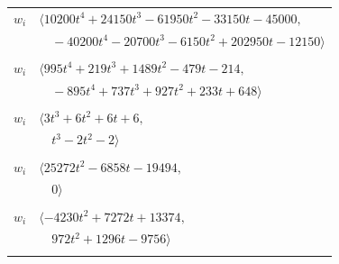 \documentclass[11pt]{article}
\begin{document}
\begin{longtable}{@{}ll@{}}
$w_i$ & $\langle 10200t^{4}+24150t^{3}-61950t^{2}-33150t-45000,$\\
 & $\quad -40200t^{4}-20700t^{3}-6150t^{2}+202950t-12150\rangle$\\
\addlinespace[2pt]
\multicolumn{2}{@{}p{0.97\textwidth}@{}}{$i=46$, $D_i=1$, $\rho_{ij}$: $9{:}1, \allowbreak 14{:}1, \allowbreak 15{:}1, \allowbreak 18{:}3, \allowbreak 26{:}1, \allowbreak 27{:}3, \allowbreak 28{:}3, \allowbreak 30{:}3, \allowbreak 35{:}3, \allowbreak 36{:}1, \allowbreak 49{:}3, \allowbreak 54{:}1, \allowbreak 57{:}1, \allowbreak 64{:}2, \allowbreak 70{:}2, \allowbreak 78{:}1$}\\
$w_i$ & $\langle 995t^{4}+219t^{3}+1489t^{2}-479t-214,$\\
 & $\quad -895t^{4}+737t^{3}+927t^{2}+233t+648\rangle$\\
\addlinespace[2pt]
\multicolumn{2}{@{}p{0.97\textwidth}@{}}{$i=47$, $D_i=1$, $\rho_{ij}$: $18{:}2, \allowbreak 21{:}3, \allowbreak 25{:}1, \allowbreak 29{:}1, \allowbreak 30{:}2, \allowbreak 37{:}2, \allowbreak 63{:}1$}\\
$w_i$ & $\langle 3t^{3}+6t^{2}+6t+6,$\\
 & $\quad t^{3}-2t^{2}-2\rangle$\\
\addlinespace[2pt]
\multicolumn{2}{@{}p{0.97\textwidth}@{}}{$i=48$, $D_i=1$, $\rho_{ij}$: $1{:}1, \allowbreak 6{:}3, \allowbreak 7{:}3, \allowbreak 8{:}2, \allowbreak 9{:}2, \allowbreak 12{:}1, \allowbreak 34{:}3, \allowbreak 35{:}3, \allowbreak 36{:}1, \allowbreak 38{:}3, \allowbreak 45{:}1, \allowbreak 50{:}2, \allowbreak 60{:}3, \allowbreak 65{:}2, \allowbreak 66{:}2, \allowbreak 70{:}1, \allowbreak 79{:}1, \allowbreak 80{:}2$}\\
$w_i$ & $\langle 25272t^{2}-6858t-19494,$\\
 & $\quad 0\rangle$\\
\addlinespace[2pt]
\multicolumn{2}{@{}p{0.97\textwidth}@{}}{$i=49$, $D_i=1$, $\rho_{ij}$: $8{:}1, \allowbreak 9{:}2, \allowbreak 12{:}1, \allowbreak 16{:}1, \allowbreak 17{:}3, \allowbreak 23{:}2, \allowbreak 32{:}1, \allowbreak 36{:}2, \allowbreak 37{:}1, \allowbreak 38{:}3, \allowbreak 39{:}2, \allowbreak 46{:}1, \allowbreak 51{:}2, \allowbreak 58{:}2, \allowbreak 69{:}1, \allowbreak 74{:}1, \allowbreak 78{:}3$}\\
$w_i$ & $\langle -4230t^{2}+7272t+13374,$\\
 & $\quad 972t^{2}+1296t-9756\rangle$\\
\addlinespace[2pt]
\multicolumn{2}{@{}p{0.97\textwidth}@{}}{$i=50$, $D_i=1$, $\rho_{ij}$: $7{:}2, \allowbreak 8{:}1, \allowbreak 17{:}2, \allowbreak 20{:}2, \allowbreak 27{:}2, \allowbreak 28{:}3, \allowbreak 29{:}2, \allowbreak 30{:}1, \allowbreak 32{:}3, \allowbreak 37{:}2, \allowbreak 39{:}3, \allowbreak 42{:}1, \allowbreak 44{:}3, \allowbreak 45{:}3, \allowbreak 48{:}2, \allowbreak 55{:}1, \allowbreak 56{:}2, \allowbreak 66{:}1, \allowbreak 70{:}3, \allowbreak 73{:}3$}\\

\end{longtable}
\end{document}
